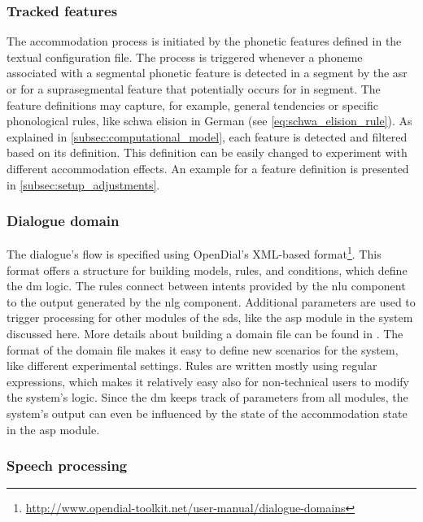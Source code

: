 \subsubsection{Tracked features}
\label{subsubsec:tracked_features}

The accommodation process is initiated by the phonetic features defined in the textual configuration file.
The process is triggered whenever a phoneme associated with a segmental phonetic feature is detected in a segment by the \ac{asr} or for a suprasegmental feature that potentially occurs for in segment.
The feature definitions may capture, for example, general tendencies or specific phonological rules, like schwa elision in German (see \cref{eq:schwa_elision_rule}).
As explained in \cref{subsec:computational_model}, each feature is detected and filtered based on its definition.
This definition can be easily changed to experiment with different accommodation effects.
An example for a feature definition is presented in \cref{subsec:setup_adjustments}.

\subsubsection{Dialogue domain}
\label{subsubsec:dialogue_domain}

The dialogue's flow is specified using OpenDial's XML-based format\footnote{\url{http://www.opendial-toolkit.net/user-manual/dialogue-domains}}.
This format offers a structure for building models, rules, and conditions, which define the \ac{dm} logic.
The rules connect between intents provided by the \ac{nlu} component to the output generated by the \ac{nlg} component.
Additional parameters are used to trigger processing for other modules of the \ac{sds}, like the \ac{asp} module in the system discussed here.
More details about building a domain file can be found in \citet{Lison2016opendial}.
The format of the domain file makes it easy to define new scenarios for the system, like different experimental settings.
Rules are written mostly using regular expressions, which makes it relatively easy also for non-technical users to modify the system's logic.
Since the \ac{dm} keeps track of parameters from all modules, the system's output can even be influenced by the state of the accommodation state in the \ac{asp} module.

\subsubsection{Speech processing}
\label{subsubsec:speech_processing}

